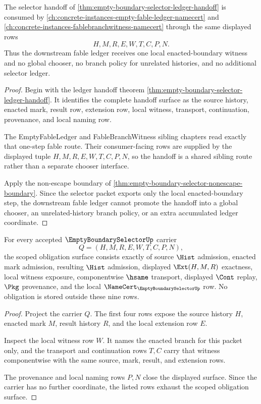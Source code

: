 \begin{theorem}
\label{thm:empty-boundary-selector-fable-sibling-route}
The selector handoff of \autoref{thm:empty-boundary-selector-ledger-handoff} is consumed by \autoref{ch:concrete-instances-empty-fable-ledger-namecert} and \autoref{ch:concrete-instances-fablebranchwitness-namecert} through the same displayed rows
$$
H,M,R,E,W,T,C,P,N.
$$
Thus the downstream fable ledger receives one local enacted-boundary witness and no global chooser, no branch policy for unrelated histories, and no additional selector ledger.
\end{theorem}
\begin{proof}
Begin with the ledger handoff theorem \autoref{thm:empty-boundary-selector-ledger-handoff}. It identifies the complete handoff surface as the source history, enacted mark, result row, extension row, local witness, transport, continuation, provenance, and local naming row.

The EmptyFableLedger and FableBranchWitness sibling chapters read exactly that one-step fable route. Their consumer-facing rows are supplied by the displayed tuple $H,M,R,E,W,T,C,P,N$, so the handoff is a shared sibling route rather than a separate chooser interface.

Apply the non-escape boundary of \autoref{thm:empty-boundary-selector-nonescape-boundary}. Since the selector packet exports only the local enacted-boundary step, the downstream fable ledger cannot promote the handoff into a global chooser, an unrelated-history branch policy, or an extra accumulated ledger coordinate.
\end{proof}

\begin{theorem}
\label{thm:emptyboundaryselector-obligation-surface}
For every accepted $\EmptyBoundarySelectorUp$ carrier
$$
Q=(H,M,R,E,W,T,C,P,N),
$$
the scoped obligation surface consists exactly of source $\Hist$ admission, enacted mark admission, resulting $\Hist$ admission, displayed $\Ext(H,M,R)$ exactness, local witness exposure, componentwise $\hsame$ transport, displayed $\Cont$ replay, $\Pkg$ provenance, and the local $\NameCert_{\EmptyBoundarySelectorUp}$ row. No obligation is stored outside these nine rows.
\end{theorem}
\begin{proof}
Project the carrier $Q$. The first four rows expose the source history $H$, enacted mark $M$, result history $R$, and the local extension row $E$.

Inspect the local witness row $W$. It names the enacted branch for this packet only, and the transport and continuation rows $T,C$ carry that witness componentwise with the same source, mark, result, and extension rows.

The provenance and local naming rows $P,N$ close the displayed surface. Since the carrier has no further coordinate, the listed rows exhaust the scoped obligation surface.
\end{proof}

